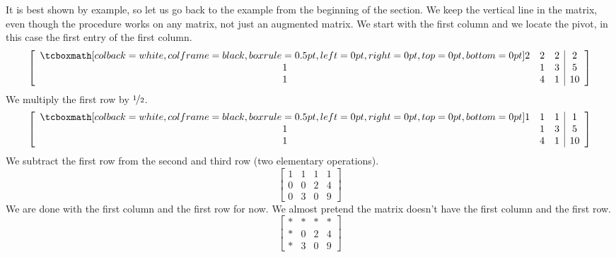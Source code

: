 It is best shown by example, so let us go back to the 
example from the beginning of the section.
We keep the vertical line in the matrix,
even though the procedure works on any matrix, not just
an augmented matrix.
We start with the first column and we locate the pivot, in this
case the first entry of the first column.
\begin{equation*}
\left[
\begin{array}{ccc|c}
\mybxsm{2} & 2 & 2 & 2 \\
1 & 1 & 3 & 5 \\
1 & 4 & 1 & 10
\end{array}
\right]
\end{equation*}
We multiply the first row by
$\nicefrac{1}{2}$.
\begin{equation*}
\left[
\begin{array}{ccc|c}
\mybxsm{1} & 1 & 1 & 1 \\
1 & 1 & 3 & 5 \\
1 & 4 & 1 & 10
\end{array}
\right]
\end{equation*}
We subtract the first row from the second and third row (two elementary
operations).
\begin{equation*}
\left[
\begin{array}{ccc|c}
1 & 1 & 1 & 1 \\
0 & 0 & 2 & 4 \\
0 & 3 & 0 & 9
\end{array}
\right]
\end{equation*}
We are done with the first column and the first row for now.  We almost
pretend the matrix doesn't have the first column and the first row.
\begin{equation*}
\left[
\begin{array}{ccc|c}
* & * & * & * \\
* & 0 & 2 & 4 \\
* & 3 & 0 & 9
\end{array}
\right]
\end{equation*}


